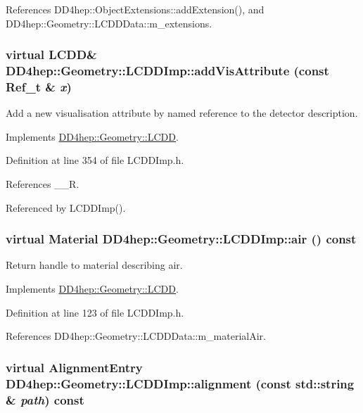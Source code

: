 References DD4hep::ObjectExtensions::addExtension(), and DD4hep::Geometry::LCDDData::m\_\-extensions.\hypertarget{class_d_d4hep_1_1_geometry_1_1_l_c_d_d_imp_a6b0b4c0f5d67a156215447e385820dc4}{
\subsubsection[{addVisAttribute}]{\setlength{\rightskip}{0pt plus 5cm}virtual {\bf LCDD}\& DD4hep::Geometry::LCDDImp::addVisAttribute (const {\bf Ref\_\-t} \& {\em x})}}
\label{class_d_d4hep_1_1_geometry_1_1_l_c_d_d_imp_a6b0b4c0f5d67a156215447e385820dc4}


Add a new visualisation attribute by named reference to the detector description. 

Implements \hyperlink{class_d_d4hep_1_1_geometry_1_1_l_c_d_d_a705cc171273fe3aa63100385b1bd7191}{DD4hep::Geometry::LCDD}.

Definition at line 354 of file LCDDImp.h.

References \_\-\_\-R.

Referenced by LCDDImp().\hypertarget{class_d_d4hep_1_1_geometry_1_1_l_c_d_d_imp_a7cbfdb3a6fc06844d2a9e4f3d0f52d92}{
\subsubsection[{air}]{\setlength{\rightskip}{0pt plus 5cm}virtual {\bf Material} DD4hep::Geometry::LCDDImp::air () const}}
\label{class_d_d4hep_1_1_geometry_1_1_l_c_d_d_imp_a7cbfdb3a6fc06844d2a9e4f3d0f52d92}


Return handle to material describing air. 

Implements \hyperlink{class_d_d4hep_1_1_geometry_1_1_l_c_d_d_a35239d8469cba6c091e970a1baec312b}{DD4hep::Geometry::LCDD}.

Definition at line 123 of file LCDDImp.h.

References DD4hep::Geometry::LCDDData::m\_\-materialAir.\hypertarget{class_d_d4hep_1_1_geometry_1_1_l_c_d_d_imp_af544526d9d90bffac48221b8f77eb265}{
\subsubsection[{alignment}]{\setlength{\rightskip}{0pt plus 5cm}virtual {\bf AlignmentEntry} DD4hep::Geometry::LCDDImp::alignment (const std::string \& {\em path}) const}}
\label{class_d_d4hep_1_1_geometry_1_1_l_c_d_d_imp_af544526d9d90bffac48221b8f77eb265}


